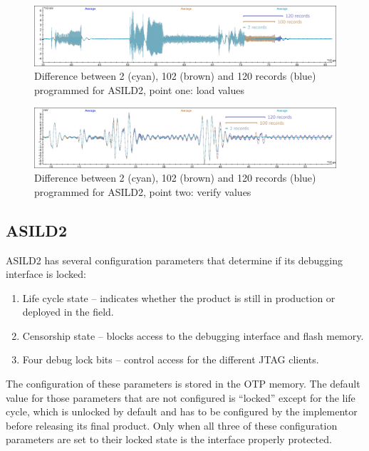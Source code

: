 \documentclass[a4paper, 10pt]{IEEEtran}
\newcommand{\ST}{ASILD2\xspace}
\begin{document}
\begin{figure}[hbt]
  \centering
  \includegraphics[width=\textwidth]{spc570-DPA-records}
  \caption{Difference between 2 (cyan), 102 (brown) and 120 records (blue) programmed for \ST, point one: load values}
  \label{fig:jtag-st}
\end{figure}

\begin{figure}[hbt]
  \centering
  \includegraphics[width=\textwidth]{spc570-DPA-records-2}
  \caption{Difference between 2 (cyan), 102 (brown) and 120 records (blue) programmed for \ST, point two: verify values}
  \label{fig:jtag-st-2}
\end{figure}

\subsection{\ST}

\ST has several configuration parameters that determine if its debugging interface is locked:
\begin{enumerate}
    \item Life cycle state \label{enum:lifecycle} -- indicates whether the product is still in production or deployed in the field. 
    \item Censorship state \label{enum:censor} -- blocks access to the debugging interface and flash memory.
    \item Four debug lock bits \label{enum:dbl} -- control access for the different JTAG clients. 
\end{enumerate}
The configuration of these parameters is stored in the OTP memory. The default value for those parameters that are not configured is ``locked'' except for the life cycle, which is unlocked by default and has to be configured by the implementor before releasing its final product. Only when all three of these configuration parameters are set to their locked state is the interface properly protected. 
\end{document}
